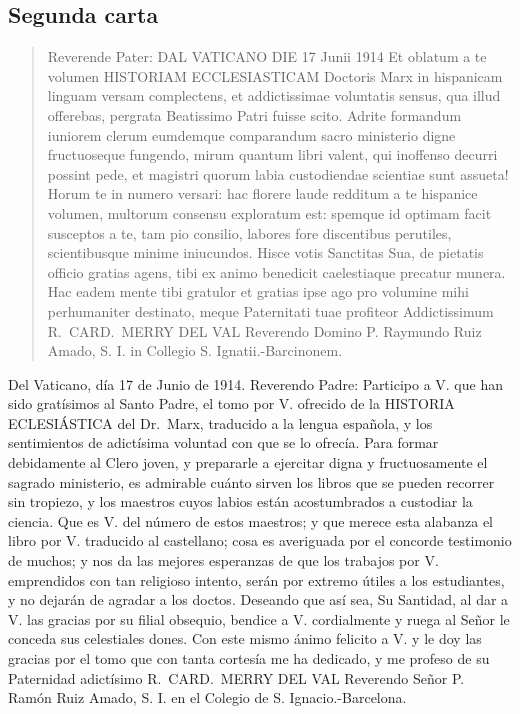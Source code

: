 \raggedbottom{} \documentclass[12pt]{book}
\begin{document}
\subsection{Segunda carta}
\begin{quotation}
  Reverende Pater:
  DAL VATICANO DIE 17 Junii 1914
  Et oblatum a te volumen HISTORIAM ECCLESIASTICAM Doctoris
  Marx in hispanicam linguam versam complectens, et addictissimae voluntatis sensus, qua illud offerebas, pergrata Beatissimo
  Patri fuisse scito.
  Adrite formandum iuniorem clerum eumdemque comparandum
  sacro ministerio digne fructuoseque fungendo, mirum quantum
  libri valent, qui inoffenso decurri possint pede, et magistri quorum labia custodiendae scientiae sunt assueta! Horum te in numero versari: hac florere laude redditum a te hispanice volumen,
  multorum consensu exploratum est: spemque id optimam facit
  susceptos a te, tam pio consilio, labores fore discentibus perutiles, scientibusque minime iniucundos.
  Hisce votis Sanctitas Sua, de pietatis officio gratias agens,
  tibi ex animo benedicit caelestiaque precatur munera.
  Hac eadem mente tibi gratulor et gratias ipse ago pro volumine mihi perhumaniter destinato, meque Paternitati tuae profiteor
  Addictissimum
  R.\ CARD.\ MERRY DEL VAL
  Reverendo Domino P. Raymundo Ruiz Amado, S. I. in Collegio
  S. Ignatii.-Barcinonem.
\end{quotation}
Del Vaticano, día 17 de Junio de 1914.
Reverendo Padre:
Participo a V. que han sido gratísimos al Santo Padre, el tomo
por V. ofrecido de la HISTORIA ECLESIÁSTICA del Dr.\ Marx, traducido
a la lengua española, y los sentimientos de adictísima voluntad con
que se lo ofrecía.
Para formar debidamente al Clero joven, y prepararle a ejercitar
digna y fructuosamente el sagrado ministerio, es admirable cuánto sirven los libros que se pueden recorrer sin tropiezo, y los maestros cuyos labios están acostumbrados a custodiar la ciencia. Que es V. del
número de estos maestros; y que merece esta alabanza el libro por
V. traducido al castellano; cosa es averiguada por el concorde testimonio de muchos; y nos da las mejores esperanzas de que los trabajos
por V. emprendidos con tan religioso intento, serán por extremo útiles
a los estudiantes, y no dejarán de agradar a los doctos.
Deseando que así sea, Su Santidad, al dar a V. las gracias por su
filial obsequio, bendice a V. cordialmente y ruega al Señor le conceda
sus celestiales dones.
Con este mismo ánimo felicito a V. y le doy las gracias por el
tomo que con tanta cortesía me ha dedicado, y me profeso de su
Paternidad adictísimo
R.\ CARD.\ MERRY DEL VAL
Reverendo Señor P. Ramón Ruiz Amado, S. I. en el Colegio de
S. Ignacio.-Barcelona.
\end{document}
